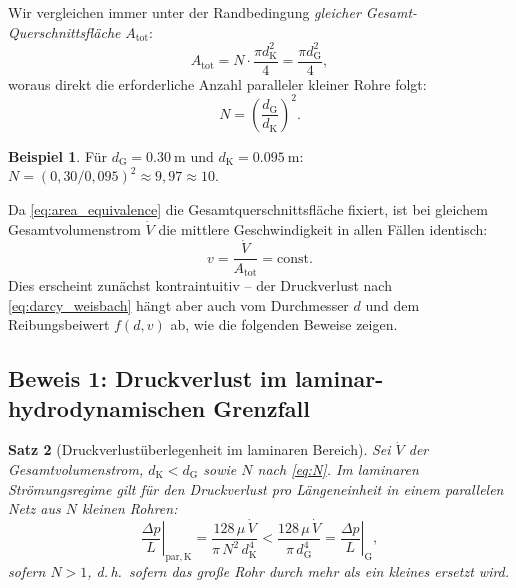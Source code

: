 ﻿\documentclass[12pt,a4paper,twoside]{article}
\theoremstyle{plain}
\newtheorem{theorem}{Satz}[section]
\theoremstyle{definition}
\newtheorem{example}[theorem]{Beispiel}
\theoremstyle{remark}
\newcommand{\dG}{d_{\mathrm{G}}}
\newcommand{\dK}{d_{\mathrm{K}}}
\begin{document}
Wir vergleichen immer unter der Randbedingung \emph{gleicher
Gesamt-Querschnittsfläche} $A_{\mathrm{tot}}$:
\begin{equation}
  A_{\mathrm{tot}} = N \cdot \frac{\pi \dK^2}{4}
    = \frac{\pi \dG^2}{4},
  \label{eq:area_equivalence}
\end{equation}
woraus direkt die erforderliche Anzahl paralleler kleiner Rohre folgt:
\begin{equation}
  N = \left(\frac{\dG}{\dK}\right)^2.
  \label{eq:N}
\end{equation}

\begin{example}
Für $\dG = \SI{0.30}{\metre}$ und $\dK = \SI{0.095}{\metre}$:
$N = (0{,}30 / 0{,}095)^2 \approx 9{,}97 \approx 10$.
\end{example}

Da \cref{eq:area_equivalence} die Gesamtquerschnittsfläche fixiert, ist bei
gleichem Gesamtvolumenstrom $\dot{V}$ die mittlere Geschwindigkeit in allen
Fällen identisch:
\begin{equation}
  v = \frac{\dot{V}}{A_{\mathrm{tot}}} = \mathrm{const}.
  \label{eq:same_velocity}
\end{equation}
Dies erscheint zunächst kontraintuitiv -- der Druckverlust nach
\cref{eq:darcy_weisbach} hängt aber auch vom Durchmesser $d$ und dem
Reibungsbeiwert $f(d, v)$ ab, wie die folgenden Beweise zeigen.

\subsection{Beweis 1: Druckverlust im laminar-hydrodynamischen Grenzfall}
\label{ssec:beweis_lam}

\begin{theorem}[Druckverlustüberlegenheit im laminaren Bereich]
\label{thm:druckverlust_lam}
Sei $\dot{V}$ der Gesamtvolumenstrom, $\dK < \dG$ sowie $N$ nach
\cref{eq:N}.
Im laminaren Strömungsregime gilt für den Druckverlust pro Längeneinheit
in einem parallelen Netz aus $N$ kleinen Rohren:
\begin{equation}
  \left.\frac{\Delta p}{L}\right|_{\mathrm{par, K}}
  = \frac{128\,\mu\,\dot{V}}{\pi\,N^2\,\dK^4}
  < \frac{128\,\mu\,\dot{V}}{\pi\,\dG^4}
  = \left.\frac{\Delta p}{L}\right|_{\mathrm{G}},
  \label{eq:lam_druckverlust_vergleich}
\end{equation}
sofern $N > 1$, d.\,h.\ sofern das große Rohr durch mehr als ein kleines
ersetzt wird.
\end{theorem}
\end{document}
